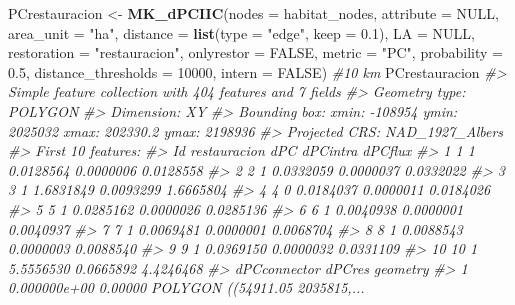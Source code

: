 \documentclass[
]{book}
\newenvironment{Shaded}{\begin{snugshade}}{\end{snugshade}}
\newcommand{\AttributeTok}[1]{\textcolor[rgb]{0.13,0.29,0.53}{#1}}
\newcommand{\CommentTok}[1]{\textcolor[rgb]{0.56,0.35,0.01}{\textit{#1}}}
\newcommand{\ConstantTok}[1]{\textcolor[rgb]{0.56,0.35,0.01}{#1}}
\newcommand{\DecValTok}[1]{\textcolor[rgb]{0.00,0.00,0.81}{#1}}
\newcommand{\FloatTok}[1]{\textcolor[rgb]{0.00,0.00,0.81}{#1}}
\newcommand{\FunctionTok}[1]{\textcolor[rgb]{0.13,0.29,0.53}{\textbf{#1}}}
\newcommand{\NormalTok}[1]{#1}
\newcommand{\OtherTok}[1]{\textcolor[rgb]{0.56,0.35,0.01}{#1}}
\newcommand{\StringTok}[1]{\textcolor[rgb]{0.31,0.60,0.02}{#1}}
\begin{document}
\begin{Shaded}
\begin{Highlighting}[]
\NormalTok{PCrestauracion }\OtherTok{\textless{}{-}} \FunctionTok{MK\_dPCIIC}\NormalTok{(}\AttributeTok{nodes =}\NormalTok{ habitat\_nodes,}
                \AttributeTok{attribute =} \ConstantTok{NULL}\NormalTok{,}
                \AttributeTok{area\_unit =} \StringTok{"ha"}\NormalTok{,}
                \AttributeTok{distance =} \FunctionTok{list}\NormalTok{(}\AttributeTok{type =} \StringTok{"edge"}\NormalTok{, }\AttributeTok{keep =} \FloatTok{0.1}\NormalTok{),}
                \AttributeTok{LA =} \ConstantTok{NULL}\NormalTok{,}
                \AttributeTok{restoration =} \StringTok{"restauracion"}\NormalTok{,}
                \AttributeTok{onlyrestor =} \ConstantTok{FALSE}\NormalTok{,}
                \AttributeTok{metric =} \StringTok{"PC"}\NormalTok{,}
                \AttributeTok{probability =} \FloatTok{0.5}\NormalTok{,}
                \AttributeTok{distance\_thresholds =} \DecValTok{10000}\NormalTok{,}
                \AttributeTok{intern =} \ConstantTok{FALSE}\NormalTok{) }\CommentTok{\#10 km}
\NormalTok{PCrestauracion}
\CommentTok{\#\textgreater{} Simple feature collection with 404 features and 7 fields}
\CommentTok{\#\textgreater{} Geometry type: POLYGON}
\CommentTok{\#\textgreater{} Dimension:     XY}
\CommentTok{\#\textgreater{} Bounding box:  xmin: {-}108954 ymin: 2025032 xmax: 202330.2 ymax: 2198936}
\CommentTok{\#\textgreater{} Projected CRS: NAD\_1927\_Albers}
\CommentTok{\#\textgreater{} First 10 features:}
\CommentTok{\#\textgreater{}    Id restauracion       dPC  dPCintra   dPCflux}
\CommentTok{\#\textgreater{} 1   1            1 0.0128564 0.0000006 0.0128558}
\CommentTok{\#\textgreater{} 2   2            1 0.0332059 0.0000037 0.0332022}
\CommentTok{\#\textgreater{} 3   3            1 1.6831849 0.0093299 1.6665804}
\CommentTok{\#\textgreater{} 4   4            0 0.0184037 0.0000011 0.0184026}
\CommentTok{\#\textgreater{} 5   5            1 0.0285162 0.0000026 0.0285136}
\CommentTok{\#\textgreater{} 6   6            1 0.0040938 0.0000001 0.0040937}
\CommentTok{\#\textgreater{} 7   7            1 0.0069481 0.0000001 0.0068704}
\CommentTok{\#\textgreater{} 8   8            1 0.0088543 0.0000003 0.0088540}
\CommentTok{\#\textgreater{} 9   9            1 0.0369150 0.0000032 0.0331109}
\CommentTok{\#\textgreater{} 10 10            1 5.5556530 0.0665892 4.4246468}
\CommentTok{\#\textgreater{}    dPCconnector    dPCres                       geometry}
\CommentTok{\#\textgreater{} 1  0.000000e+00   0.00000 POLYGON ((54911.05 2035815,...}

\end{Highlighting}
\end{Shaded}
\end{document}
